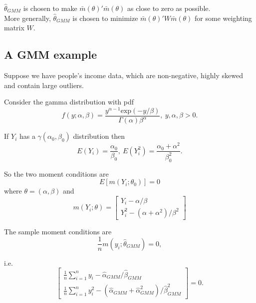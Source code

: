 $\hat \theta_{GMM}$ is chosen to make $\bar m(\theta)'\bar
m(\theta)$ as close to
zero as possible.\\

More generally, $\hat \theta_{GMM}$ is chosen to minimize $\bar
m(\theta)'W \bar m(\theta)$ for some weighting matrix $W$.

\subsection{A GMM example}

Suppose we have people's income data, which are non-negative,
highly skewed and contain large outliers.

Consider the gamma distribution with pdf
\begin{equation}
f(y; \alpha, \beta)=\frac{y^{\alpha-1}
{\mathrm{exp}}(-y/\beta)}{\Gamma(\alpha)\beta^\alpha}, \ y,
\alpha, \beta>0.
\end{equation}

If $Y_i$ has a $\gamma(\alpha_0, \beta_0)$ distribution then
\begin{equation}
E(Y_i)=\frac{\alpha_0}{\beta_0}, \
E(Y_i^2)=\frac{\alpha_0+\alpha^2}{\beta_0^2}.
\end{equation}

So the two moment conditions are
\begin{equation}
E[m(Y_i; \theta_0)]=0
\end{equation}
where $\theta=(\alpha, \beta)$ and
\begin{equation}
m(Y_i; \theta)=
\begin{bmatrix}
Y_i-\alpha/\beta \\ Y_i^2-(\alpha+\alpha^2)/\beta^2
\end{bmatrix}
\end{equation}

The sample moment conditions are
\begin{equation}
\frac{1}{n} m(y_i; \hat \theta_{GMM})=0,
\end{equation}

i.e.
\begin{equation}
\begin{bmatrix}
\frac{1}{n} \sum_{i=1}^{n} y_i- \hat \alpha_{GMM}/ \hat \beta_{GMM} \\
\frac{1}{n} \sum_{i=1}^{n} y_i^2-(\hat \alpha_{GMM}+ \hat
\alpha_{GMM}^2) / \hat \beta_{GMM}^2
\end{bmatrix}
=0.
\end{equation}

